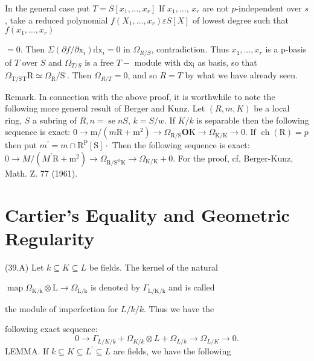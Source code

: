 In the general case put $T=S\left[x_{1}, \ldots, x_{r}\right]$ If $x_{1}, \ldots$, $x_{r}$ are not $p$-independent over $s$, take a reduced polynomial $f\left(X_{1}, \ldots, x_{r}\right) \varepsilon S[X]$ of lowest degree such that $f\left(x_{1}, \ldots, x_{r}\right)$

$=0$. Then $\Sigma\left(\partial f / \partial \mathrm{x}_{i}\right) \mathrm{dx}_{i}=0$ in $\Omega_{R / S}$, contradiction. Thus $x_{1}, \ldots, x_{r}$ is a p-basis of $T$ over $S$ and $\Omega_{T / S}$ is a free $T-$ module with $\mathrm{dx}_{\mathrm{i}}$ as basis, so that $\Omega_{\mathrm{T} / \mathrm{S}}{ }_{\mathrm{T}} \mathrm{R} \simeq \Omega_{\mathrm{R}} / \mathrm{S}^{\cdot}$. Then $\Omega_{R / T}=0$, and so $R=T$ by what we have already seen.

Remark. In connection with the above proof, it is worthwhile to note the following more general result of Berger and Kunz. Let $(R, m, K)$ be a local ring, $S$ a subring of $R, n=\operatorname{se} n S$, $k=S / w$. If $K / k$ is separable then the following sequence is exact: $0 \rightarrow \mathrm{m} /\left(m \mathrm{R}+\mathrm{m}^{2}\right) \rightarrow \Omega_{\mathrm{R} / \mathrm{S}} \boldsymbol{O} \mathrm{K} \rightarrow \Omega_{\mathrm{K} / \mathrm{K}} \rightarrow 0$. If $\operatorname{ch}(\mathrm{R})=p$ then put $m^{\prime}=m \cap \mathrm{R}^{\mathrm{P}}[\mathrm{S}] \cdot$ Then the following sequence is exact: $0 \rightarrow M /\left(M^{\prime} \mathrm{R}+\mathrm{m}^{2}\right) \rightarrow \Omega_{\mathrm{R} / \mathrm{S}^{\otimes} \mathrm{K}} \rightarrow \Omega_{\mathrm{K} / \mathrm{K}}+0$. For the proof, cf, Berger-Kunz, Math. Z. 77 (1961).

\section{Cartier's Equality and Geometric Regularity}
(39.A) Let $k \subseteq K \subseteq L$ be fields. The kernel of the natural

$\operatorname{map} \Omega_{\mathrm{K} / \mathrm{k}} \otimes \mathrm{L} \rightarrow \Omega_{\mathrm{L} / \mathrm{k}}$ is denoted by $\Gamma_{\mathrm{L} / \mathrm{K} / \mathrm{k}}$ and is called

the module of imperfection for $L / k / k$. Thus we have the

following exact sequence:
$$
0 \rightarrow \Gamma_{L / K / k}+\Omega_{K / k} \otimes L+\Omega_{L / k} \rightarrow \Omega_{L / K} \rightarrow 0 .
$$
LEMMA. If $k \subseteq K \subseteq L^{\prime} \subseteq L$ are fields, we have the following

